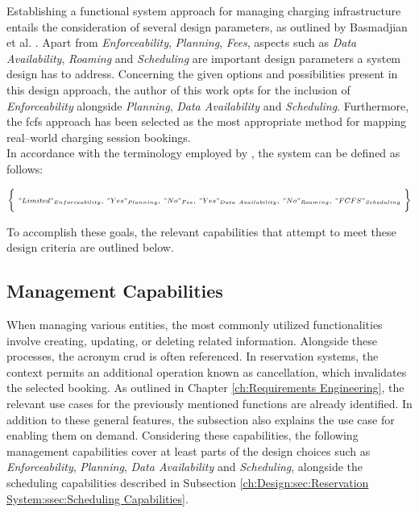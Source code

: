 Establishing a functional system approach for managing charging infrastructure entails the consideration of several design parameters, as outlined by Basmadjian et al. \cite{basmadjian_reference_2020}. Apart from \textit{Enforceability}, \textit{Planning}, \textit{Fees}, aspects such as \textit{Data Availability}, \textit{Roaming} and \textit{Scheduling} are important design parameters a system design has to address.
Concerning the given options and possibilities present in this design approach, the author of this work opts for the inclusion of \textit{Enforceability} alongside \textit{Planning}, \textit{Data Availability} and \textit{Scheduling}. 
Furthermore, the \acrshort{fcfs} approach has been selected as the most appropriate method for mapping real--world charging session bookings.\\
\noindent In accordance with the terminology employed by \cite{basmadjian_reference_2020}, the system can be defined as follows:

\begin{eqnarray*}
\scriptstyle \biggl\{\ "Limited"_{Enforceability},\ "Yes"_{Planning},\ "No"_{Fee},\ "Yes"_{Data\ Availability},\ "No"_{Roaming},\ "FCFS"_{Scheduling}\ \biggr\}
\end{eqnarray*}

\noindent To accomplish these goals, the relevant capabilities that attempt to meet these design criteria are outlined below.

\subsection{Management Capabilities}
\label{ch:Design:sec:Reservation System:ssec:Management Capabilities}

When managing various entities, the most commonly utilized functionalities involve creating, updating, or deleting related information. Alongside these processes, the acronym \acrshort{crud} is often referenced. In reservation systems, the context permits an additional operation known as cancellation, which invalidates the selected booking.
As outlined in Chapter \ref{ch:Requirements Engineering}, the relevant use cases for the previously mentioned functions are already identified. In addition to these general features, the subsection also explains the use case for enabling them on demand.
Considering these capabilities, the following management capabilities cover at least parts of the design choices such as \textit{Enforceability}, \textit{Planning}, \textit{Data Availability} and \textit{Scheduling}, alongside the scheduling capabilities described in Subsection \ref{ch:Design:sec:Reservation System:ssec:Scheduling Capabilities}.

